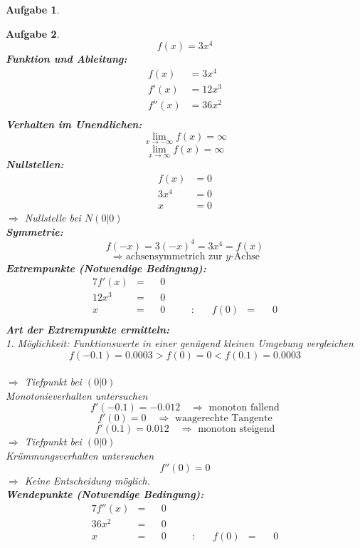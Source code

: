 \documentclass[12pt]{article}
\theoremstyle{note}
\newtheorem{aufgabe}{Aufgabe}
\begin{document}
\begin{flushleft}
\begin{aufgabe}
\end{aufgabe}\clearpage\begin{aufgabe} ~  
$$f(x)=3 x^{4}$$ 
{\bf Funktion und Ableitung:} 
\begin{align*} 
f(x)&=3 x^{4}\\ 
f'(x)&=12 x^{3}\\ 
f''(x)&=36 x^{2}\\ 
\end{align*} 
{\bf Verhalten im Unendlichen:} 
\[ \lim_{x\rightarrow -\infty} f(x) =\infty\]\[ \lim_{x\rightarrow\infty} f(x) =\infty\]{\bf Nullstellen:} 
\begin{align*} 
f(x)&=0 \\ 
3 x^{4}&=0 \\ 
x&=0\end{align*} 
$\Rightarrow$ Nullstelle bei $N(0|0)$ \\ 
{\bf Symmetrie:} 
\[ f(-x)=3 (-x)^{4}=3 x^{4}=f(x) \]\[ \Rightarrow \text{achsensymmetrich zur $y$-Achse} \]{\bf Extrempunkte (Notwendige Bedingung):} 
\begin{alignat*}{7} 
f'(x)&=& &0& \\ 
12 x^{3}&=& &0& \\ 
x&=& &0& \quad &:& \quad f(0)&=& \, &0\\ 
\end{alignat*} 
{\bf Art der Extrempunkte ermitteln:} \\[1em] 
{\em 1. M\"oglichkeit:} Funktionswerte in einer gen\"ugend kleinen Umgebung vergleichen \\ 
$$f(-0.1)=0.0003  >  f(0)=0  <   f(0.1)=0.0003$$\\ 
$\Rightarrow$ Tiefpunkt bei $(0|0)$ \\ 
\vspace{1em}{\em 2. M\"oglichkeit:} Monotonieverhalten untersuchen \\ 
$$f'(-0.1)=-0.012\quad \Rightarrow \text{ monoton fallend} $$$$f'(0)=0 \quad \Rightarrow \text{ waagerechte Tangente} $$$$f'(0.1)=0.012\quad \Rightarrow \text{ monoton steigend} $$$\Rightarrow$ Tiefpunkt bei $(0|0)$ \\ 
\vspace{1em}{\em 3. M\"oglichkeit:} Kr\"ummungsverhalten untersuchen \\ 
$$f''(0)=0$$ 
$\Rightarrow$ Keine Entscheidung m\"oglich. \\ 
{\bf Wendepunkte (Notwendige Bedingung):} 
\begin{alignat*}{7} 
f''(x)&=& &0& \\ 
36 x^{2}&=& &0& \\ 
x&=& &0& \quad &:& \quad f(0)&=& \, &0\\ 
\end{alignat*} 


\end{aufgabe}
\end{flushleft}
\end{document}
